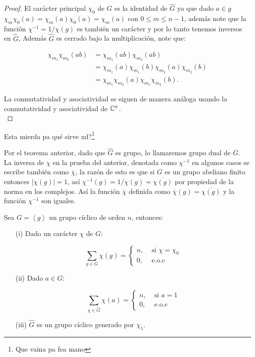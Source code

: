 \begin{proof}
El carácter principal $\chi_0$ de $G$ es la identidad de $\widehat{G}$ ya que dado $a\in g$ $\chi_m\chi_0(a)=\chi_m(a)\chi_0(a)=\chi_m(a)$ con $0\leq m\leq n-1$, además note que la función $\chi^{-1}=1/\chi(g)$ es también un carácter y por lo tanto tenemos inversos en $\widehat{G}$, Además $\widehat{G}$ es cerrado bajo la multiplicación, note que:

\begin{align*}
     \chi_{m_1}\chi_{m_2}(ab)&=\chi_{m_1}(ab)\chi_{m_2}(ab)\\
     &=\chi_{m_1}(a)\chi_{m_1}(b)\chi_{m_2}(a)\chi_{m_2}(b)\\
     &=\chi_{m_1}\chi_{m_2}(a)\chi_{m_1}\chi_{m_2}(b)
      .\end{align*}

    La conmutatividad y asociatividad se siguen de manera análoga usando la conmutatividad y asociatividad de $\mathbb{C}^{x}$.\\
\end{proof}

Esta mierda pa qué sirve xd?\footnote{Que vaina pa fea mano}

\begin{note}
Por el teorema anterior, dado que $\widehat{G}$ es grupo, lo llamaremos grupo dual de $G$.\\


La inversa de $\chi$ en la prueba del anterior, denotada  como $\chi^{-1}$ en algunos casos se escribe también como $\overline{\chi}$, la razón de esto es que si $G$ es un grupo abeliano finito entonces $|\chi(g)|=1$, así $\chi^{-1}(g)=1/\chi(g)=\overline{\chi(g)}$ por propiedad de la norma en los complejos. Así la función $\overline{\chi}$ definida como $\overline{\chi}(g)=\overline{\chi(g)}$ y la función $\chi^{-1}$ son iguales. \cite{pongsriiam2023analytic}
\end{note}

\begin{theorem}
Sea $G=\left\langle g\right\rangle$ un grupo cíclico de orden $n$, entonces:

\begin{itemize}
\item[(i)] Dado un carácter $\chi$ de $G$:

$$
\sum_{g \in G} \chi(g)= \begin{cases}n, & \text { si } \chi=\chi_0 \\ 0, & \text { e.o.c }\end{cases}
$$

\item[(ii)] Dado $a \in G$:

$$
\sum_{\chi \in \widehat{G}} \chi(a)= \begin{cases}n, & \text { si } a=1 \\ 0, & \text { e.o.c }\end{cases}
$$

\item[(iii)] $\widehat{G}$ es un grupo cíclico generado por $\chi_1$.
\end{itemize}

\end{theorem}



